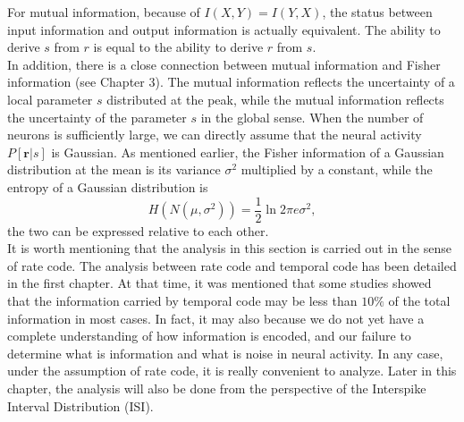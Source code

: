 For mutual information, because of $I(X,Y)=I(Y,X)$, the status between
input information and output information is actually equivalent. The
ability to derive $s$ from $r$ is equal to the ability to derive $r$
from $s$.\\

In addition, there is a close connection between mutual information
and Fisher information (see Chapter 3). The mutual information
reflects the uncertainty of a local parameter $s$ distributed at the
peak, while the mutual information reflects the uncertainty of the
parameter $s$ in the global sense. When the number of neurons is
sufficiently large, we can directly assume that the neural activity
$P[\mathbf{r}|s]$ is Gaussian. As mentioned earlier, the Fisher
information of a Gaussian distribution at the mean is its variance
$\sigma^2$ multiplied by a constant, while the entropy of a Gaussian
distribution is
\begin{equation}
  H(N(\mu,\sigma^2))=\frac{1}{2}\ln 2\pi e\sigma^2,
\end{equation}
the two can be expressed relative to each other.\\

It is worth mentioning that the analysis in this section is carried out in the sense of rate code. The analysis between rate code and temporal code has been detailed in the first chapter. At that time, it was mentioned that some studies showed that the information carried by temporal code may be less than $10\%$ of the total information in most cases. In fact, it may also because we do not yet have a complete understanding of how information is encoded, and our failure to determine what is information and what is noise in neural activity. In any case, under the assumption of rate code, it is really convenient to analyze. Later in this chapter, the analysis will also be done from the perspective of the Interspike Interval Distribution (ISI).



